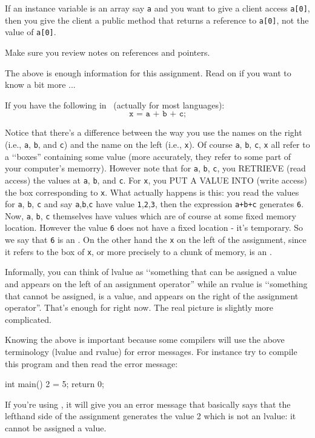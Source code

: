 If an instance variable is an array say \verb!a!
and you want to give a client access \verb!a[0]!,
then you give the client a public method that returns a reference to
\verb!a[0]!, not the value of \verb!a[0]!.

Make sure you review notes on references and pointers.

The above is enough information for this assignment.
Read on if you want  to know a bit more ...

If you have the following in \cpp\ (actually for most languages):
\[
	\texttt{x = a + b + c;}
\]

Notice that there's a difference between the way you use the names
on the right (i.e., \verb!a!, \verb!b!, and \verb!c!)
and the name on the left (i.e., \verb!x!). Of course \verb!a!,
\verb!b!, \verb!c!, \verb!x! all refer to a \lq\lq boxes''
containing some value (more accurately, they refer to some part of your
computer's memorry).
However note that for \verb!a!, \verb!b!, \verb!c!,
you RETRIEVE (read access) the values at \verb!a!, \verb!b!, and \verb!c!.
For \verb!x!, you PUT A VALUE INTO (write access) the box corresponding to
\verb!x!. What actually happens is this: you read the values for
\verb!a!, \verb!b!, \verb!c! and say
\verb!a!,\verb!b!,\verb!c! have value \verb!1!,\verb!2!,\verb!3!,
then the expression
\verb!a+b+c! generates \verb!6!.
Now, \verb!a!, \verb!b!, \verb!c!
themselves have values which are of course at some fixed memory location.
However the value \verb!6! does not have a fixed location - it's temporary.
So we say that \verb!6! is an .
On the other hand the \verb!x! on the left of the assignment,
since it refers to the box of \verb!x!,
or more precisely to a chunk of memory, is an .

Informally, you can think of lvalue as \lq\lq something that can be
assigned a value and appears on the left of an assignment operator''
while an rvalue is \lq\lq something that cannot be assigned, is a value,
and appears on the right of the assignment operator''.
That's enough for right now. The real picture is slightly more complicated.

Knowing the above is important because some compilers will use the above terminology
(lvalue and rvalue) for error messages. For instance try to compile this program and
then read the error message:
{\small
\begin{console}
int main()
{
    2 = 5;
    return 0;
}
\end{console}
}
If you're using \gpp, it will give you an error message that basically says that the lefthand side of the assignment generates the value 2 which is not an lvalue: it cannot be assigned a value. 


